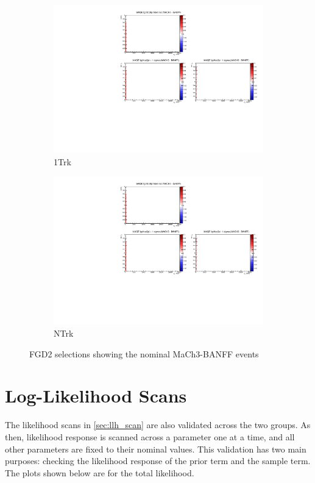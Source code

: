 \begin{figure}[h]
\begin{subfigure}[t]{0.24\textwidth}
		\includegraphics[width=\textwidth, trim={5mm 70mm 100mm 7mm}, clip, page=13]{figures/mach3/banff/momentumProjections_170328_withMACH3_MAQEonly}
		\caption{\numu 1Trk}
	\end{subfigure}
	\begin{subfigure}[t]{0.24\textwidth}
		\includegraphics[width=\textwidth, trim={5mm 70mm 100mm 7mm}, clip, page=14]{figures/mach3/banff/momentumProjections_170328_withMACH3_MAQEonly}
		\caption{\numu NTrk}
	\end{subfigure}
	\caption{FGD2 selections showing the nominal MaCh3-BANFF events}
	\label{fig:mach3_banff_prefit_fgd2}
\end{figure}

\section{Log-Likelihood Scans}
The likelihood scans in \autoref{sec:llh_scan} are also validated across the two groups. As then, likelihood response is scanned across a parameter one at a time, and all other parameters are fixed to their nominal values. This validation has two main purposes: checking the likelihood response of the prior term and the sample term. The plots shown below are for the total likelihood.

